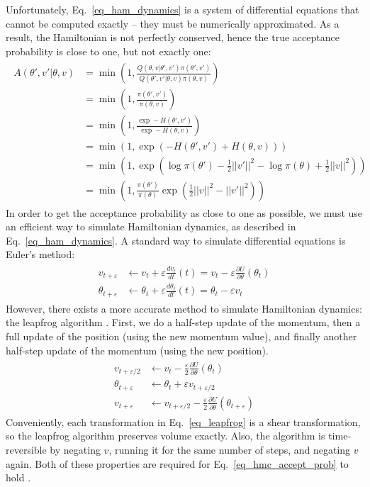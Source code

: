 \documentclass[12pt]{article}
\begin{document}
Unfortunately, Eq.\ \ref{eq_ham_dynamics} is a system of differential equations that cannot be computed exactly -- they must be numerically approximated. As a result, the Hamiltonian is not perfectly conserved, hence the true acceptance probability is close to one, but not exactly one:
\begin{align}
\begin{split}
A(\theta',v'|\theta,v) &= \min \left(1, \frac{Q(\theta,v|\theta',v')\pi(\theta',v')}{Q(\theta',v'|\theta,v)\pi(\theta,v)} \right) \\
&= \min \left(1, \frac{\pi(\theta',v')}{\pi(\theta,v)} \right) \\
&= \min \left(1, \frac{\exp -H(\theta',v')}{\exp -H(\theta,v)} \right) \\
&= \min \left(1, \exp \left(-H(\theta', v') + H(\theta, v) \right) \right) \\
&= \min \left(1, \exp \left(\log \pi(\theta') - \frac{1}{2}||v'||^2 -\log \pi(\theta) + \frac{1}{2}||v||^2 \right) \right) \\
&= \min \left(1, \frac{\pi(\theta')}{\pi(\theta)} \exp \left( \frac{1}{2}||v||^2 - ||v'||^2 \right) \right)
\end{split}
\label{eq_hmc_accept_prob}
\end{align}
In order to get the acceptance probability as close to one as possible, we must use an efficient way to simulate Hamiltonian dynamics, as described in Eq.\ \ref{eq_ham_dynamics}. A standard way to simulate differential equations is Euler’s method:
\begin{align}
\begin{split}
v_{t+\varepsilon} &\leftarrow v_t + \varepsilon \frac{dv_t}{dt}(t) = v_t - \varepsilon \frac{\partial U}{\partial \theta}(\theta_t) \\
\theta_{t+\varepsilon} &\leftarrow \theta_t + \varepsilon \frac{d\theta_t}{dt}(t) = \theta_t - \varepsilon v_t
\end{split}
\end{align}
However, there exists a more accurate method to simulate Hamiltonian dynamics: the leapfrog algorithm \cite{hmc}. First, we do a half-step update of the momentum, then a full update of the position (using the new momentum value), and finally another half-step update of the momentum (using the new position).
\begin{align}
\begin{split}
v_{t+\varepsilon/2} &\leftarrow v_t - \frac{\varepsilon}{2} \frac{\partial U}{\partial \theta}(\theta_t) \\
\theta_{t+\varepsilon} &\leftarrow \theta_t + \varepsilon v_{t+\varepsilon/2} \\
v_{t+\varepsilon} &\leftarrow v_{t+\varepsilon/2} - \frac{\varepsilon}{2} \frac{\partial U}{\partial \theta}(\theta_{t+\varepsilon})
\end{split}
\label{eq_leapfrog}
\end{align}
Conveniently, each transformation in Eq.\ \ref{eq_leapfrog} is a shear transformation, so the leapfrog algorithm preserves volume exactly. Also, the algorithm is time-reversible by negating $v$, running it for the same number of steps, and negating $v$ again. Both of these properties are required for Eq.\ \ref{eq_hmc_accept_prob} to hold \cite{hmc}.
\end{document}
